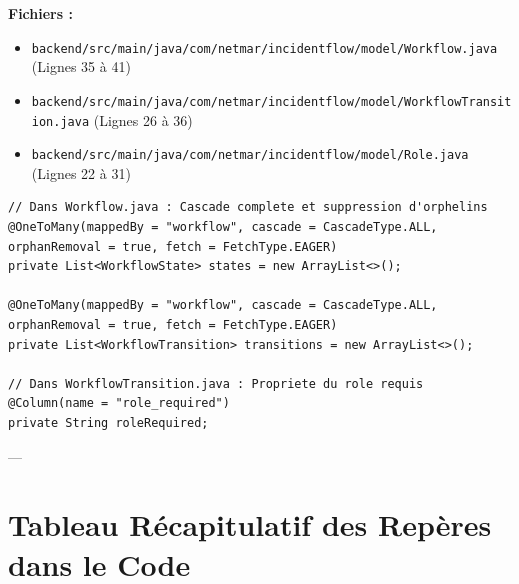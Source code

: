 \documentclass[11pt,a4paper]{article}
\begin{document}
\begin{codebox}[title=Localisation dans le Code :]
\textbf{Fichiers :}
\begin{itemize}
    \item \small\texttt{backend/src/main/java/com/netmar/incidentflow/model/Workflow.java} (Lignes 35 à 41)
    \item \small\texttt{backend/src/main/java/com/netmar/incidentflow/model/WorkflowTransition.java} (Lignes 26 à 36)
    \item \small\texttt{backend/src/main/java/com/netmar/incidentflow/model/Role.java} (Lignes 22 à 31)
\end{itemize}
\end{codebox}

\begin{lstlisting}[language=CustomJava, caption={Annotations de cascade JPA dans Workflow.java et WorkflowTransition.java}]
// Dans Workflow.java : Cascade complete et suppression d'orphelins
@OneToMany(mappedBy = "workflow", cascade = CascadeType.ALL, orphanRemoval = true, fetch = FetchType.EAGER)
private List<WorkflowState> states = new ArrayList<>();

@OneToMany(mappedBy = "workflow", cascade = CascadeType.ALL, orphanRemoval = true, fetch = FetchType.EAGER)
private List<WorkflowTransition> transitions = new ArrayList<>();

// Dans WorkflowTransition.java : Propriete du role requis
@Column(name = "role_required")
private String roleRequired;
\end{lstlisting}

---

\section{Tableau Récapitulatif des Repères dans le Code}
\end{document}
